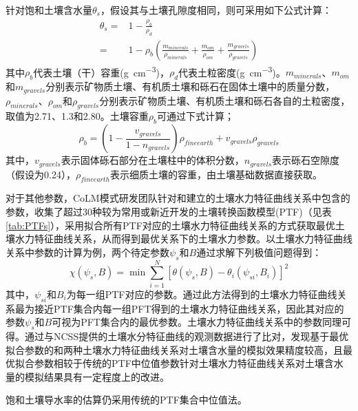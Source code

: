 针对饱和土壤含水量$\theta_s$，假设其与土壤孔隙度相同，则可采用如下公式计算：
\begin{equation}
    \begin{aligned}
        \theta_s =& 1-\frac{\rho_b}{\rho_d}\\
        =& 1-\rho_b\left(\frac{m_{minerals}}{\rho_{minerals}}+\frac{m_{om}}{\rho_{om}}+\frac{m_{gravels}}{\rho_{gravels}}\right)
    \end{aligned}
\end{equation}
其中$\rho_b$代表土壤（干）容重(\unit{g.cm^{-3}})，$\rho_d$代表土粒密度(\unit{g.cm^{-3}})。$m_{minerals}$、$m_{om}$和$m_{gravels}$分别表示矿物质土壤、有机质土壤和砾石在固体土壤中的质量分数，$\rho_{minerals}$、$\rho_{om}$和$\rho_{gravels}$分别表示矿物质土壤、有机质土壤和砾石各自的土粒密度，取值为2.71、1.3和2.80。土壤容重$\rho_b$可通过下式计算；$$\rho_b=\left(1-\frac{v_{gravels}}{1-n_{gravels}}\right)\rho_{fineearth}+v_{gravels}\rho_{gravels}$$
其中，$v_{gravels}$表示固体砾石部分在土壤柱中的体积分数，$n_{gravels}$表示砾石空隙度（假设为0.24），$\rho_{fineearth}$表示细质土壤的容重，由土壤基础数据直接获取。

对于其他参数，CoLM模式研发团队针对\citet{campbell1974}和\citet{van1980closed}建立的土壤水力特征曲线关系中包含的参数，收集了超过30种较为常用或新近开发的土壤转换函数模型(PTF)（见表\ref{tab:PTFs}），采用拟合所有PTF对应的土壤水力特征曲线关系的方式获取最优土壤水力特征曲线关系，从而得到最优关系下的土壤水力参数。以\citet{campbell1974}土壤水力特征曲线关系中参数的计算为例，两个待定参数$\psi_s$和$B$通过求解下列极值问题得到：$$\chi\left(\psi_s,B\right)=\min\sum_{i=1}^N\left[\theta\left(\psi_s,B\right)-\theta_i\left(\psi_{si},B_{i}\right)\right]^2$$
其中，$\psi_{si}$和$B_{i}$为每一组PTF对应的参数。通过此方法得到的土壤水力特征曲线关系最为接近PTF集合内每一组PFT得到的土壤水力特征曲线关系，因此其对应的参数$\psi_{s}$和$B$可视为PFT集合内的最优参数。\citet{van1980closed}土壤水力特征曲线关系中的参数同理可得。\citep{dai2019parameters}通过与NCSS提供的土壤水分特征曲线的观测数据进行了比对，发现基于最优拟合参数的\citet{campbell1974}和\citet{van1980closed}两种土壤水力特征曲线关系对土壤含水量的模拟效果精度较高，且最优拟合参数相较于传统的PTF中位值参数针对土壤水力特征曲线关系对土壤含水量的模拟结果具有一定程度上的改进。

饱和土壤导水率的估算仍采用传统的PTF集合中位值法。

